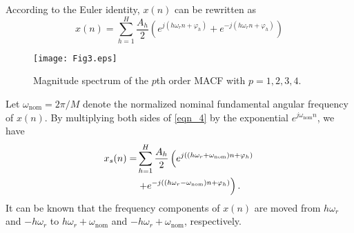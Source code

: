\documentclass[journal,twoside]{IEEEtran}
\begin{document}
According to the Euler identity, $x(n)$ can be rewritten as
\begin{equation}
x(n)=\sum_{h=1}^{H}\dfrac{A_h}{2}\left(e^{j\left(h\omega_r n+\varphi_h\right)}+e^{-j\left(h\omega_r n+\varphi_h\right)}\right)\label{eqn_4}
\end{equation}

\begin{figure}
	\centering
	\texttt{[image: Fig3.eps]}
	\caption{Magnitude spectrum of the $p$th order MACF with $p=1,2,3,4$.}
	\label{fig_1}													
\end{figure}
Let $\omega_\mathrm{nom}=2\pi /M$ denote the normalized nominal fundamental angular frequency of $x(n)$. By multiplying both sides of \eqref{eqn_4} by the exponential $e^{j\omega_\mathrm{nom}n}$, we have%
\begin{align}%
x_s(n)=&\sum_{h=1}^{H}\dfrac{A_h}{2}\left(e^{j\left((h\omega_r+\omega_\mathrm{nom})n+\varphi_h\right)}\right.\notag\\
&\left.+e^{-j\left((h\omega_r -\omega_\mathrm{nom})n+\varphi_h\right)}\right).\label{eqn_5}
\end{align}
It can be known that the frequency components of $x(n)$ are moved from $h\omega_r$ and $-h\omega_r$ to $h\omega_r+\omega_\mathrm{nom}$ and $-h\omega_r+\omega_\mathrm{nom}$, respectively.
\end{document}
